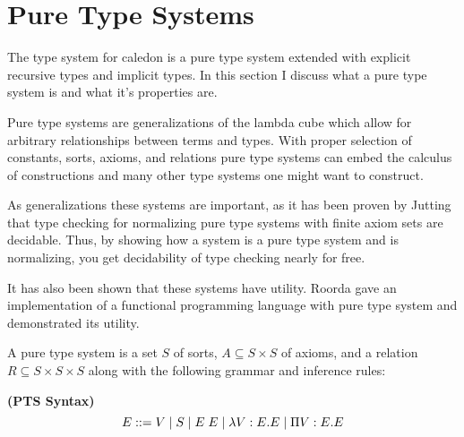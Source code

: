 \section{Pure Type Systems}

The type system for caledon is a pure type system \citep{mckinna1993pure} 
extended with explicit recursive types and implicit types.  In this section
I discuss what a pure type system is and what it's properties are.

Pure type systems are generalizations of the lambda cube
\citep{barendregt1991introduction} which allow for arbitrary 
relationships between terms and types.
With proper selection of constants, sorts, axioms, and relations
pure type systems can embed the calculus of constructions \citep{coquand1986calculus}
and many other type systems one might want to construct.

As generalizations these systems are important, as it has been proven by Jutting \citep{jutting1993typing} that 
type checking for normalizing pure type systems with finite axiom sets are decidable.  Thus, by showing how a system is a pure type system and is normalizing, 
you get decidability of type checking nearly for free.

It has also been shown that these systems have utility.  
Roorda \citep{roorda2001pure} gave an implementation of a functional programming language with 
pure type system and demonstrated its utility.

A pure type system is a set $S$ of sorts, 
$A\subseteq S \times S$ of axioms, and a relation 
$R \subseteq S \times S \times S$ along with the following grammar and inference rules:

\begin{definition}
\textbf{(PTS Syntax)}
\[ 
E ::=  V 
 \; | \; S 
 \; | \; E\;E 
 \; | \; \lambda V : E . E 
 \; | \; \Pi V : E . E 
\]

\label{pt:syntax}
\end{definition}

